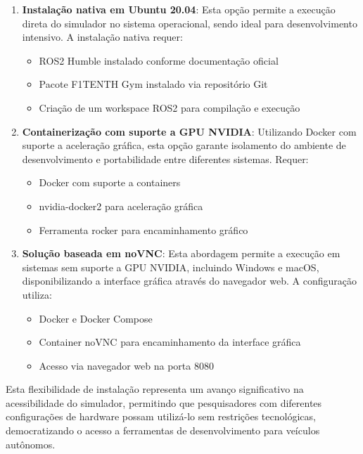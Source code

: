 \begin{enumerate}
    \item \textbf{Instalação nativa em Ubuntu 20.04}: Esta opção permite a execução direta do simulador no sistema operacional, sendo ideal para desenvolvimento intensivo. A instalação nativa requer:
          \begin{itemize}
              \item ROS2 Humble instalado conforme documentação oficial
              \item Pacote F1TENTH Gym instalado via repositório Git
              \item Criação de um workspace ROS2 para compilação e execução
          \end{itemize}

    \item \textbf{Containerização com suporte a GPU NVIDIA}: Utilizando Docker com suporte a aceleração gráfica, esta opção garante isolamento do ambiente de desenvolvimento e portabilidade entre diferentes sistemas. Requer:
          \begin{itemize}
              \item Docker com suporte a containers
              \item nvidia-docker2 para aceleração gráfica
              \item Ferramenta rocker para encaminhamento gráfico
          \end{itemize}

    \item \textbf{Solução baseada em noVNC}: Esta abordagem permite a execução em sistemas sem suporte a GPU NVIDIA, incluindo Windows e macOS, disponibilizando a interface gráfica através do navegador web. A configuração utiliza:
          \begin{itemize}
              \item Docker e Docker Compose
              \item Container noVNC para encaminhamento da interface gráfica
              \item Acesso via navegador web na porta 8080
          \end{itemize}
\end{enumerate}

Esta flexibilidade de instalação representa um avanço significativo na
acessibilidade do simulador, permitindo que pesquisadores com diferentes
configurações de hardware possam utilizá-lo sem restrições tecnológicas,
democratizando o acesso a ferramentas de desenvolvimento para veículos
autônomos.

